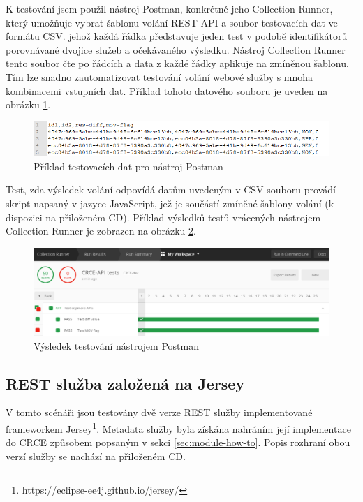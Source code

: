 \documentclass[czech,DP]{thesiskiv}
\begin{document}
K testování jsem použil nástroj Postman, konkrétně jeho Collection Runner, který umožňuje vybrat šablonu volání REST API a soubor testovacích dat ve formátu CSV. jehož každá řádka představuje jeden test v podobě identifikátorů porovnávané dvojice služeb a očekávaného výsledku. Nástroj Collection Runner tento soubor čte po řádcích a data z každé řádky aplikuje na zmíněnou šablonu. Tím lze snadno zautomatizovat testování volání webové služby s mnoha kombinacemi vstupních dat. Příklad tohoto datového souboru je uveden na obrázku \ref{fig:test-data-csv}. 

\begin{figure}[h]
	\centering
	\includegraphics[width=\linewidth]{test-data-csv.png}
	\caption{Příklad testovacích dat pro nástroj Postman}
	\label{fig:test-data-csv}
\end{figure}

Test, zda výsledek volání odpovídá datům uvedeným v CSV souboru provádí skript napsaný v jazyce JavaScript, jež je součástí zmíněné šablony volání (k dispozici na přiloženém CD). Příklad výsledků testů vrácených nástrojem Collection Runner je zobrazen na obrázku \ref{fig:test-results}.

\begin{figure}[h]
	\centering
	\includegraphics[width=\linewidth]{test-results.png}
	\caption{Výsledek testování nástrojem Postman}
	\label{fig:test-results}
\end{figure}


\subsection{REST služba založená na Jersey}

V tomto scénáři jsou testovány dvě verze REST služby implementované frameworkem Jersey\footnote{https://eclipse-ee4j.github.io/jersey/}. Metadata služby byla získána nahráním její implementace do CRCE způsobem popsaným v sekci \ref{sec:module-how-to}. Popis rozhraní obou verzí služby se nachází na přiloženém CD.  
\end{document}
